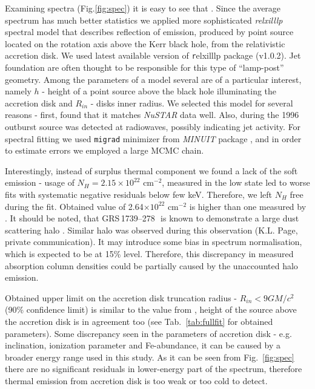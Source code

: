 \documentclass[a4paper,fleqn,usenatbib]{mnras}
\def\grs{{GRS\,1739--278\,}}
\begin{document}
Examining spectra (Fig.\ref{fig:spec}) it is easy to see that  . Since the average spectrum has much better statistics we applied more sophisticated {\it relxilllp} spectral model that describes reflection of emission, produced by point source located on the rotation axis above the Kerr black hole, from the relativistic accretion disk. 
We used latest available version of {\texttt relxilllp} package (v1.0.2).
Jet foundation are often thought to be responsible for this type of ``lamp-post'' geometry. 
Among the parameters of a model several are of a particular interest, namely $h$ - height of a point source above the black hole illuminating the accretion disk and $R_{in}$ - disks inner radius.  
We selected this model for several reasons - first, \cite{miller15_nust} found that it matches {\it NuSTAR} data well. 
Also, during the 1996 outburst source was detected at radiowaves, possibly indicating jet activity. 
For spectral fitting we used \texttt{migrad} minimizer from {\em MINUIT} package \citep{james75minuit}, and in order to estimate errors we employed a large MCMC chain. 

Interestingly, instead of surplus thermal component we found a lack of the soft emission - usage of $N_{H} = 2.15\times10^{22}$ cm$^{-2}$, measured in the low state \citep{fuerst16_gx339} led to worse fits with systematic negative residuals below few keV. 
Therefore, we left $N_{H}$ free during the fit. 
Obtained value of 2.64$\times10^{22}$ cm$^{-2}$ is higher than one measured by \cite{fuerst16_gx339}. It should be noted, that \grs\, is known to demonstrate a large dust scattering halo \citep{greiner96}. Similar halo was observed during this observation (K.L. Page, private communication). It may introduce some bias in spectrum normalisation, which is expected to be at 15\% level. Therefore, this discrepancy in measured absorption column densities could be partially caused by the unaccounted halo emission.


Obtained upper limit on the accretion disk truncation radius - $R_{in} < 9 GM/c^{2}$ (90\% confidence limit) is similar to the value from \cite{miller15_nust}, height of the source above the accretion disk is in agreement too (see Tab.~\ref{tab:fullfit} for obtained parameters). 
Some discrepancy seen in the parameters of accretion disk - e.g. inclination, ionization parameter and Fe-abundance, it can be caused by a broader energy range used in this study. 
As it can be seen from Fig.~\ref{fig:spec} there are no significant residuals in lower-energy part of the spectrum, therefore thermal emission from accretion disk is too weak or too cold to detect. 
\end{document}
